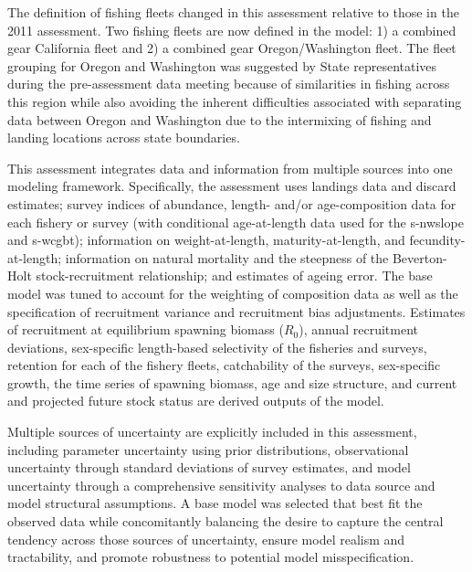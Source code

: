 \documentclass[11pt,
  english,
  a4paper,
]{article}
\begin{document}
The definition of fishing fleets changed in this assessment relative to those in the 2011 assessment. Two fishing fleets are now defined in the model: 1) a combined gear California fleet and 2) a combined gear Oregon/Washington fleet. The fleet grouping for Oregon and Washington was suggested by State representatives during the pre-assessment data meeting because of similarities in fishing across this region while also avoiding the inherent difficulties associated with separating data between Oregon and Washington due to the intermixing of fishing and landing locations across state boundaries.

\leavevmode\tagmcend\tagstructend\par


This assessment integrates data and information from multiple sources into one modeling framework. Specifically, the assessment uses landings data and discard estimates; survey indices of abundance, length- and/or age-composition data for each fishery or survey (with conditional age-at-length data used for the \gls{s-nwslope} and \gls{s-wcgbt}); information on weight-at-length, maturity-at-length, and fecundity-at-length; information on natural mortality and the steepness of the Beverton-Holt stock-recruitment relationship; and estimates of ageing error. The base model was tuned to account for the weighting of composition data as well as the specification of recruitment variance and recruitment bias adjustments. Estimates of recruitment at equilibrium spawning biomass ({\(R_0\)\leavevmode\tagmcend\tagstructend}), annual recruitment deviations, sex-specific length-based selectivity of the fisheries and surveys, retention for each of the fishery fleets, catchability of the surveys, sex-specific growth, the time series of spawning biomass, age and size structure, and current and projected future stock status are derived outputs of the model.

\leavevmode\tagmcend\tagstructend\par


Multiple sources of uncertainty are explicitly included in this assessment, including parameter uncertainty using prior distributions, observational uncertainty through standard deviations of survey estimates, and model uncertainty through a comprehensive sensitivity analyses to data source and model structural assumptions. A base model was selected that best fit the observed data while concomitantly balancing the desire to capture the central tendency across those sources of uncertainty, ensure model realism and tractability, and promote robustness to potential model misspecification.
\end{document}
